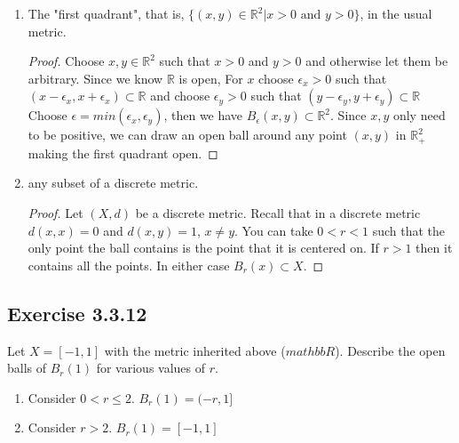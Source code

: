\documentclass{tufte-book}
\theoremstyle{mytheoremstyle}
\theoremstyle{mylemstyle}
\theoremstyle{mydefstyle}
\begin{document}
\begin{enumerate}
\item The "first quadrant", that is, $\{(x,y) \in \mathbb{R}^2 | x > 0 \text{ and } y > 0 \}$, in the usual metric.

\begin{proof}
Choose $x, y \in \mathbb{R}^2$ such that $x > 0$ and $y > 0$ and otherwise let them be arbitrary.    Since we know $\mathbb{R}$ is open, For $x$ choose $\epsilon_x > 0$ such that $(x-\epsilon_x, x+\epsilon_x) \subset \mathbb{R}$ and choose $\epsilon_y >0$ such that $(y-\epsilon_y, y+\epsilon_y) \subset \mathbb{R}$   Choose $\epsilon = min(\epsilon_x, \epsilon_y)$, then we have $B_\epsilon(x,y) \subset \mathbb{R}^2$.  Since $x,y$ only need to be positive, we can draw an open ball around any point $(x,y)$ in $\mathbb{R}_+^2$ making the first quadrant open.
\end{proof}

\item any subset of a discrete metric.

\begin{proof}
Let $(X, d)$ be a discrete metric.  Recall that in a discrete metric $d(x,x) = 0$ and $d(x,y)=1$, $x \neq y$.   You can take $0<r<1$ such that the only point the ball contains is the point that it is centered on.  If $r>1$ then it contains all the points.  In either case $B_r(x) \subset X$.
\end{proof}
\end{enumerate}

\subsection{Exercise 3.3.12}
Let $X = [-1,1]$ with the metric inherited above ($mathbb{R}$).  Describe the open balls of $B_r(1)$ for various values of $r$.

\begin{enumerate}

\item Consider $0< r \leq 2$.  $B_r(1) = (-r, 1]$
\item Consider $r > 2$. $B_r(1) = [-1,1]$ 
\end{enumerate}
\end{document}
